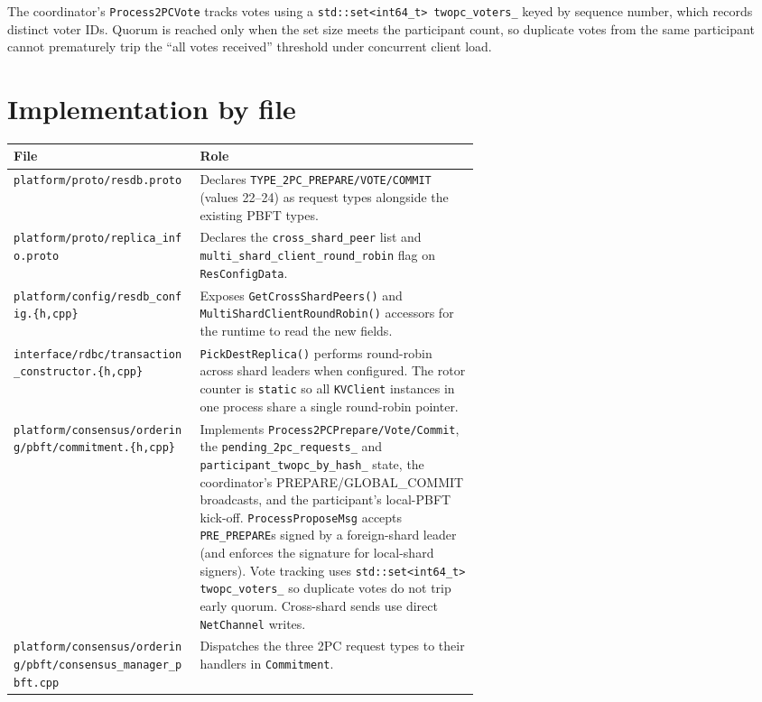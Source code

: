\documentclass[11pt]{article}
\begin{document}
The coordinator's \texttt{Process2PCVote} tracks votes using a
\texttt{std::set<int64\_t> twopc\_voters\_} keyed by sequence number,
which records distinct voter IDs. Quorum is reached only when the
set size meets the participant count, so duplicate votes from the same
participant cannot prematurely trip the ``all votes received''
threshold under concurrent client load.

\section{Implementation by file}

\begin{tabular}{lp{0.6\linewidth}}
  \toprule
  \textbf{File} & \textbf{Role} \\
  \midrule
  \texttt{platform/proto/resdb.proto}
    & Declares \texttt{TYPE\_2PC\_PREPARE/VOTE/COMMIT} (values 22--24) as request types alongside the existing PBFT types. \\
  \texttt{platform/proto/replica\_info.proto}
    & Declares the \texttt{cross\_shard\_peer} list and \texttt{multi\_shard\_client\_round\_robin} flag on \texttt{ResConfigData}. \\
  \texttt{platform/config/resdb\_config.\{h,cpp\}}
    & Exposes \texttt{GetCrossShardPeers()} and \texttt{MultiShardClientRoundRobin()} accessors for the runtime to read the new fields. \\
  \texttt{interface/rdbc/transaction\_constructor.\{h,cpp\}}
    & \texttt{PickDestReplica()} performs round-robin across shard leaders when configured. The rotor counter is \texttt{static} so all \texttt{KVClient} instances in one process share a single round-robin pointer. \\
  \texttt{platform/consensus/ordering/pbft/commitment.\{h,cpp\}}
    & Implements \texttt{Process2PCPrepare/Vote/Commit}, the \texttt{pending\_2pc\_requests\_} and \texttt{participant\_twopc\_by\_hash\_} state, the coordinator's PREPARE/GLOBAL\_COMMIT broadcasts, and the participant's local-PBFT kick-off. \texttt{ProcessProposeMsg} accepts \texttt{PRE\_PREPARE}s signed by a foreign-shard leader (and enforces the signature for local-shard signers). Vote tracking uses \texttt{std::set<int64\_t> twopc\_voters\_} so duplicate votes do not trip early quorum. Cross-shard sends use direct \texttt{NetChannel} writes. \\
  \texttt{platform/consensus/ordering/pbft/consensus\_manager\_pbft.cpp}
    & Dispatches the three 2PC request types to their handlers in \texttt{Commitment}. \\

\end{tabular}
\end{document}
